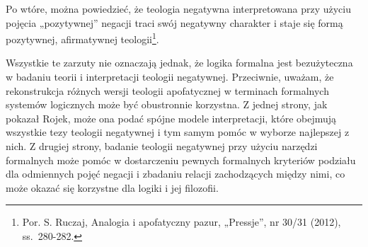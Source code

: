 Po wtóre, można powiedzieć, że teologia negatywna interpretowana przy
użyciu pojęcia „pozytywnej” negacji traci swój negatywny charakter i
staje się formą pozytywnej, afirmatywnej teologii\footnote{Por. S.
Ruczaj, Analogia i apofatyczny pazur, „Pressje”, nr 30/31 (2012),
ss.~280-282.}.

Wszystkie te zarzuty nie oznaczają jednak, że logika formalna jest
bezużyteczna w badaniu teorii i interpretacji teologii negatywnej.
Przeciwnie, uważam, że rekonstrukcja różnych wersji teologii
apofatycznej w terminach formalnych systemów logicznych może być
obustronnie korzystna. Z jednej strony, jak pokazał Rojek, może ona
podać spójne modele interpretacji, które obejmują wszystkie tezy
teologii negatywnej i tym samym pomóc w wyborze najlepszej z nich. Z
drugiej strony, badanie teologii negatywnej przy użyciu narzędzi
formalnych może pomóc w dostarczeniu pewnych formalnych kryteriów
podziału dla odmiennych pojęć negacji i zbadaniu relacji zachodzących
między nimi, co może okazać się korzystne dla logiki i jej filozofii.

